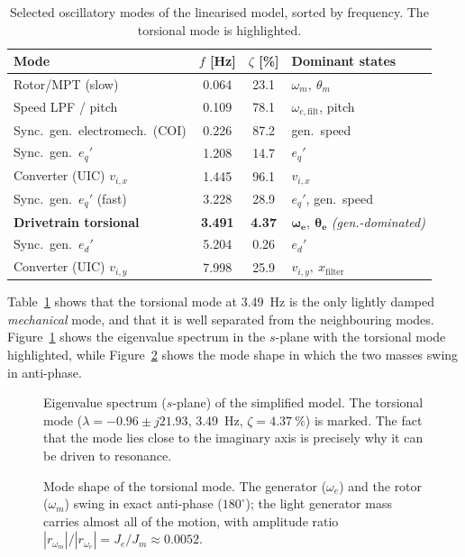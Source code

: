 \begin{table}[t]
  \centering
  \caption{Selected oscillatory modes of the linearised model, sorted by
  frequency. The torsional mode is highlighted.}
  \label{tab:modes}
  \begin{tabular}{lccl}
    \toprule
    Mode & $f$ [\si{\hertz}] & $\zeta$ [\%] & Dominant states \\
    \midrule
    Rotor/MPT (slow)          & 0.064 & 23.1 & $\omega_m,\ \theta_m$ \\
    Speed LPF / pitch         & 0.109 & 78.1 & $\omega_{e,\mathrm{filt}}$, pitch \\
    Sync.\ gen.\ electromech.\ (COI) & 0.226 & 87.2 & gen.\ speed \\
    Sync.\ gen.\ $e_q'$       & 1.208 & 14.7 & $e_q'$ \\
    Converter (UIC) $v_{i,x}$ & 1.445 & 96.1 & $v_{i,x}$ \\
    Sync.\ gen.\ $e_q'$ (fast)& 3.228 & 28.9 & $e_q'$, gen.\ speed \\
    \textbf{Drivetrain torsional}& \textbf{3.491} & \textbf{4.37} &
      $\boldsymbol{\omega_e,\ \theta_e}$ \emph{(gen.-dominated)} \\
    Sync.\ gen.\ $e_d'$       & 5.204 & 0.26 & $e_d'$ \\
    Converter (UIC) $v_{i,y}$ & 7.998 & 25.9 & $v_{i,y},\ x_{\mathrm{filter}}$ \\
    \bottomrule
  \end{tabular}
\end{table}

Table~\ref{tab:modes} shows that the torsional mode at \SI{3.49}{\hertz} is the
only lightly damped \emph{mechanical} mode, and that it is well separated from
the neighbouring modes. Figure~\ref{fig:eigs} shows the eigenvalue spectrum in
the $s$-plane with the torsional mode highlighted, while
Figure~\ref{fig:modeshape} shows the mode shape in which the two masses swing
in anti-phase.

\begin{figure}[t]
  \centering
  \caption{Eigenvalue spectrum ($s$-plane) of the simplified model. The
  torsional mode ($\lambda = -0.96 \pm j21.93$, \SI{3.49}{\hertz},
  $\zeta = \SI{4.37}{\percent}$) is marked. The fact that the mode lies close
  to the imaginary axis is precisely why it can be driven to resonance.}
  \label{fig:eigs}
\end{figure}

\begin{figure}[t]
  \centering
  \caption{Mode shape of the torsional mode. The generator ($\omega_e$) and the
  rotor ($\omega_m$) swing in exact anti-phase ($180^\circ$); the light
  generator mass carries almost all of the motion, with amplitude ratio
  $|r_{\omega_m}|/|r_{\omega_e}| = J_e/J_m \approx 0.0052$.}
  \label{fig:modeshape}
\end{figure}


